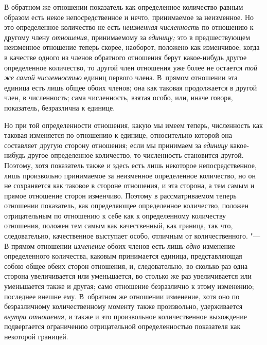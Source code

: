 В обратном же отношении показатель как определенное количество равным
образом есть некое непосредственное и нечто, принимаемое за неизменное. Но
это определенное количество не есть {\em неизменная
численность }по отношению к другому члену
{\em отношения}, принимаемому за
{\em единицу;} это в предшествующем неизменное
отношение теперь скорее, наоборот, положено как изменчивое; когда в
качестве одного из членов обратного отношения берут какое-нибудь другое
определенное количество, то другой член отношения уже более не остается
{\em той же самой численностью} единиц первого члена.
В~прямом отношении эта единица есть лишь общее обоих членов; она как таковая
продолжается в другой член, в численность; сама численность, взятая особо,
или, иначе говоря, показатель, безразлична к единице.

Но при той определенности отношения, какую мы имеем теперь, численность как
таковая изменяется по отношению к единице, относительно которой она
составляет другую сторону отношения; если мы принимаем за
{\em единицу} какое-нибудь другое определенное
количество, то численность становится другой. Поэтому, хотя показатель
также и здесь есть лишь некоторое непосредственное, лишь произвольно
принимаемое за неизменное определенное количество, но он не сохраняется как
таковое в стороне отношения, и эта сторона, а тем самым и прямое отношение
сторон изменчиво. Поэтому в рассматриваемом теперь отношении показатель,
как определяющее определенное количество, положен отрицательным по
отношению к себе как к определенному количеству отношения, положен тем
самым как качественный, как граница, так что, следовательно, качественное
выступает особо, отличным от количественного. "--- В прямом отношении
{\em изменение} обоих членов есть лишь
{\em одно} изменение определенного количества, каковым
принимается единица, представляющая собою общее обеих сторон отношения, и,
следовательно, во сколько раз одна сторона увеличивается или уменьшается,
во столько же раз увеличивается или уменьшается также и другая; само
отношение безразлично к этому изменению; последнее внешне ему. В~обратном
же отношении изменение, хотя оно по безразличному количественному моменту
также произвольно, удерживается {\em внутри отношения},
и также и это произвольное количественное выхождение подвергается
ограничению отрицательной определенностью показателя как некоторой
границей.

